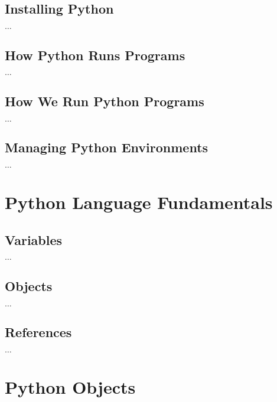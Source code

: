 \documentclass[a4paper,11pt]{book}
\numberwithin{figure}{chapter}
\numberwithin{table}{chapter}
\begin{document}
\vspace{1em}


\vspace{1em}

\section{Installing Python}

$\ldots$

\section{How Python Runs Programs}

$\ldots$

\section{How We Run Python Programs}

$\ldots$

\section{Managing Python Environments}

$\ldots$

\chapter{Python Language Fundamentals}
\label{ch:fundamentals}

\vspace{1em}


\vspace{1em}

\section{Variables}

$\ldots$

\section{Objects}

$\ldots$

\section{References}

$\ldots$

\chapter{Python Objects}
\label{ch:objects}
\end{document}
